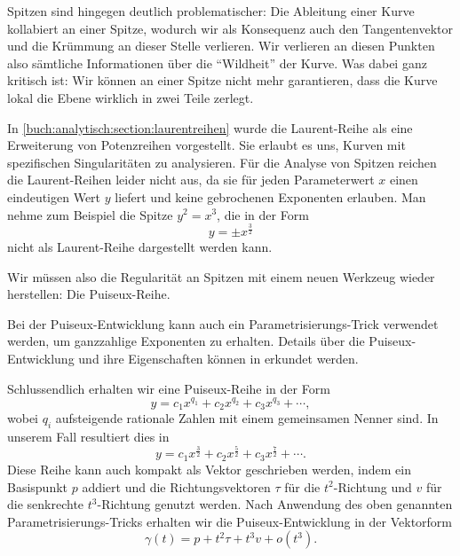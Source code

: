 Spitzen sind hingegen deutlich problematischer: Die Ableitung einer Kurve kollabiert an einer Spitze, wodurch wir als Konsequenz auch den Tangentenvektor und die Krümmung an dieser Stelle verlieren.
Wir verlieren an diesen Punkten also sämtliche Informationen über die ``Wildheit'' der Kurve.
Was dabei ganz kritisch ist: Wir können an einer Spitze nicht mehr garantieren, dass die Kurve lokal die Ebene wirklich in zwei Teile zerlegt.

In \ref{buch:analytisch:section:laurentreihen} wurde die Laurent-Reihe als eine Erweiterung von Potenzreihen vorgestellt.
Sie erlaubt es uns, Kurven mit spezifischen Singularitäten zu analysieren.
Für die Analyse von Spitzen reichen die Laurent-Reihen leider nicht aus, da sie für jeden Parameterwert $x$ einen eindeutigen Wert $y$ liefert und keine gebrochenen Exponenten erlauben.
Man nehme zum Beispiel die Spitze $y^2 = x^3$, die in der Form 
\[
    y = \pm x^{\frac{3}{2}}
\]
nicht als Laurent-Reihe dargestellt werden kann.

Wir müssen also die Regularität an Spitzen mit einem neuen Werkzeug wieder herstellen: Die Puiseux-Reihe.



Bei der Puiseux-Entwicklung kann auch ein Parametrisierungs-Trick verwendet werden, um ganzzahlige Exponenten zu erhalten.
Details über die Puiseux-Entwicklung und ihre Eigenschaften können in \cite{jordan:fischer1994} erkundet werden.

Schlussendlich erhalten wir eine Puiseux-Reihe in der Form
\[
    y = c_{1} x^{q_{1}} + c_{2} x^{q_{2}} + c_{3} x^{q_{3}} + \cdots ,
\]
wobei $q_{i}$ aufsteigende rationale Zahlen mit einem gemeinsamen Nenner sind.
In unserem Fall resultiert dies in
\[
    y = c_{1} x^{\frac{3}{2}} + c_{2} x^{\frac{5}{2}} + c_{3} x^{\frac{7}{2}} + \cdots .
\]
Diese Reihe kann auch kompakt als Vektor geschrieben werden, indem ein Basispunkt $p$ addiert und die Richtungsvektoren $\tau$ für die $t^{2}$-Richtung und $v$ für die senkrechte $t^{3}$-Richtung genutzt werden.
Nach Anwendung des oben genannten Parametrisierungs-Tricks erhalten wir die Puiseux-Entwicklung in der Vektorform
\[
    \gamma(t) = p + t^{2} \tau + t^{3} v + o(t^{3}).
\]

